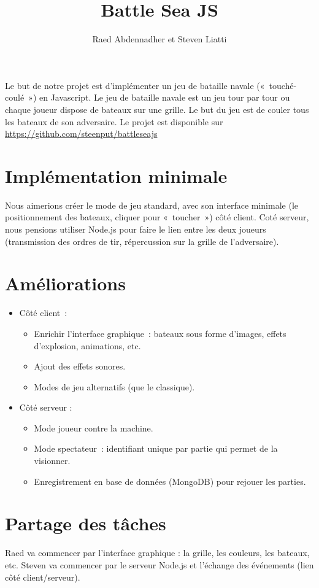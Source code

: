 \documentclass[a4paper, 11pt]{article}
\begin{document}
\title{Battle Sea JS} 
\author{Raed Abdennadher et Steven Liatti} 
\maketitle

\noindent
Le but de notre projet est d’implémenter un jeu de bataille navale (« touché-coulé ») en Javascript. Le jeu de bataille navale est un jeu tour par tour ou chaque joueur dispose de bateaux sur une grille. Le but du jeu est de couler tous les bateaux de son adversaire. 
\newline
Le projet est disponible sur \url{https://github.com/steenput/battleseajs}

\section*{Implémentation minimale}
\noindent
Nous aimerions créer le mode de jeu standard, avec son interface minimale (le positionnement des bateaux, cliquer pour « toucher ») côté client. Coté serveur, nous pensions utiliser Node.js pour faire le lien entre les deux joueurs (transmission des ordres de tir, répercussion sur la grille de l’adversaire).

\section*{Améliorations}
\noindent

\begin{itemize}
	\item Côté client :
	\begin{itemize}
		\item Enrichir l’interface graphique : bateaux sous forme d’images, effets d’explosion, animations, etc.
		\item Ajout des effets sonores.
		\item Modes de jeu alternatifs (que le classique).
	\end{itemize}
	\item Côté serveur :
	\begin{itemize}
		\item Mode joueur contre la machine.
		\item Mode spectateur : identifiant unique par partie qui permet de la visionner.
		\item Enregistrement en base de données (MongoDB) pour rejouer les parties.
	\end{itemize}
\end{itemize}

\section*{Partage des tâches}
\noindent
Raed va commencer par l'interface graphique : la grille, les couleurs, les bateaux, etc. Steven va commencer par le serveur Node.js et l'échange des événements (lien côté client/serveur).
\end{document}
